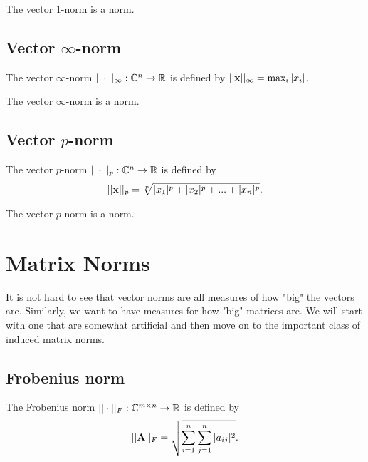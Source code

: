 \begin{proposition}{}{}
    The vector 1-norm is a norm.
\end{proposition}

\subsection{Vector $\infty$-norm}
\begin{definition}{}{}
    The vector $\infty$-norm $||\cdot||_{\infty}:\mathbb{C}^n\rightarrow \mathbb{R}$ is defined by $||\bold{x}||_{\infty}=\max_{i}|x_i|$.
\end{definition}

\begin{proposition}{}{}
    The vector $\infty$-norm is a norm.
\end{proposition}

\subsection{Vector $p$-norm}
\begin{definition}{}{}
    The vector $p$-norm $||\cdot||_p:\mathbb{C}^n\rightarrow \mathbb{R}$ is defined by
    \begin{align*}
        ||\bold{x}||_p=\sqrt[p]{|x_1|^p+|x_2|^p+...+|x_n|^p}.
    \end{align*}
\end{definition}

\begin{proposition}{}{}
    The vector $p$-norm is a norm.
\end{proposition}

\section{Matrix Norms}
It is not hard to see that vector norms are
all measures of how "big" the vectors are. Similarly,
we want to have measures for how "big" matrices are.
We will start with one that are somewhat artificial and then move on to the important class of induced matrix norms.

\subsection{Frobenius norm}
\begin{definition}{}{}
    The Frobenius norm $||\cdot||_F:\mathbb{C}^{m\times n}\rightarrow \mathbb{R}$ is defined by
    \begin{align*}
        ||\bold{A}||_F=\sqrt{\sum\limits_{i=1}^{n}\sum\limits_{j=1}^{n}|a_{ij}|^2}.
    \end{align*}
\end{definition}

